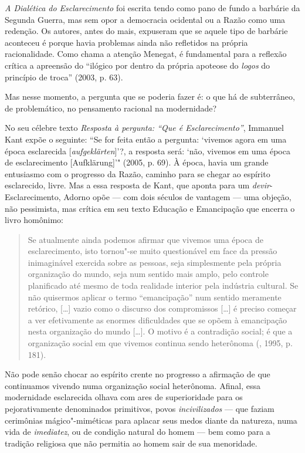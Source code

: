 \emph{A Dialética do Esclarecimento} foi escrita tendo como pano de
fundo a barbárie da Segunda Guerra, mas sem opor a democracia ocidental
ou a Razão como uma redenção. Os autores, antes do mais, expuseram que
se aquele tipo de barbárie aconteceu é porque havia problemas ainda não
refletidos na própria racionalidade. Como chama a atenção Menegat, é
fundamental para a reflexão crítica a apreensão do ``ilógico por dentro
da própria apoteose do \emph{logos} do princípio de troca'' (2003, p. 63).

Mas nesse momento, a pergunta que se poderia fazer é: o que há de
subterrâneo, de problemático, no pensamento racional na modernidade?

No seu célebre texto \emph{Resposta à pergunta: ``Que é
Esclarecimento''}, Immanuel Kant expõe o seguinte: ``Se for feita então
a pergunta: `vivemos agora em uma época esclarecida
[\emph{aufgeklärten}]'?, a resposta será: `não, vivemos em uma época
de esclarecimento [Aufklärung]'" (2005, p. 69). À época,
havia um grande entusiasmo com o progresso da Razão, caminho para se
chegar ao espírito esclarecido, livre. Mas a essa resposta de Kant, que
aponta para um \emph{devir}-Esclarecimento, Adorno opõe --- com dois
séculos de vantagem --- uma objeção, não pessimista, mas crítica em seu
texto Educação e Emancipação que encerra o livro homônimo:

\begin{quote}
Se atualmente ainda podemos afirmar que vivemos uma época de
esclarecimento, isto tornou"-se muito questionável em face da pressão
inimaginável exercida sobre as pessoas, seja simplesmente pela própria
organização do mundo, seja num sentido mais amplo, pelo controle
planificado até mesmo de toda realidade interior pela indústria
cultural. Se não quisermos aplicar o termo ``emancipação'' num sentido
meramente retórico, [\ldots{}] vazio como o discurso dos compromissos
[\ldots{}] é preciso começar a ver efetivamente as enormes dificuldades
que se opõem à emancipação nesta organização do mundo [\ldots{}]. O
motivo é a contradição social; é que a organização social em que vivemos
continua sendo heterônoma (, 1995, p. 181).
\end{quote}

Não pode senão chocar ao espírito crente no progresso a afirmação de que
continuamos vivendo numa organização social heterônoma. Afinal, essa
modernidade esclarecida olhava com ares de superioridade para os
pejorativamente denominados primitivos, povos \emph{incivilizados} --- que
faziam cerimônias mágico"-miméticas para aplacar seus medos diante da
natureza, numa vida de \emph{imediatez}, ou de condição natural do
homem --- bem como para a tradição religiosa que não permitia ao homem sair
de sua menoridade.

